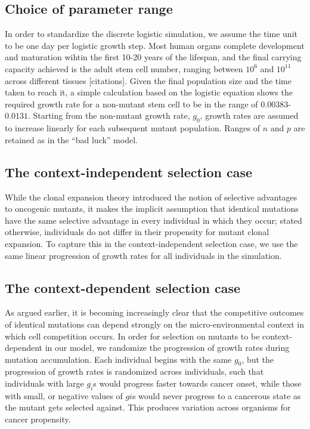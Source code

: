 \documentclass[9pt,onecolumn,twoside]{pnas-new}
\begin{document}
	\subsection*{Choice of parameter range}
	In order to standardize the discrete logistic simulation, we assume the time unit to be one day per logistic growth step. Most human organs complete development and maturation wihtin the first 10-20 years of the lifespan, and the final carrying capacity achieved is the adult stem cell number, ranging between $10^{6}$ and $10^{11}$ across different tissues [citations]. Given the final population size and the time taken to reach it, a simple calculation based on the logistic equation shows the required growth rate for a non-mutant stem cell to be in the range of $0.00383$-$0.0131$. Starting from the non-mutant growth rate, $g_{0}$, growth rates are assumed to increase linearly for each subsequent mutant population. Ranges of $n$ and $p$ are retained as in the ``bad luck'' model.

	\subsection*{The context-independent selection case}
	While the clonal expansion theory introduced the notion of selective advantages to oncogenic mutants, it makes the implicit assumption that identical mutations have the same selective advantage in every individual in which they occur; stated otherwise, individuals do not differ in their propensity for mutant clonal expansion. To capture this in the context-independent selection case, we use the same linear progression of growth rates for all individuals in the simulation.

	\subsection*{The context-dependent selection case}
	As argued earlier, it is becoming increasingly clear that the competitive outcomes of identical mutations can depend strongly on the micro-environmental context in which cell competition occurs. In order for selection on mutants to be context-dependent in our model, we randomize the progression of growth rates during mutation accumulation. Each individual begins with the same $g_{0}$, but the progression of growth rates is randomized across individuals, such that individuals with large $g_{i}$s would progress faster towards cancer onset, while those with small, or negative values of $g{i}$s would never progress to a cancerous state as the mutant gets selected against. This produces variation across organisms for cancer propensity.
\end{document}
